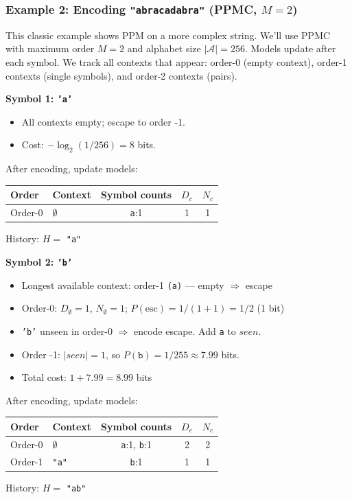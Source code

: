 \subsubsection{Example 2: Encoding \texttt{"abracadabra"} (PPMC, $M=2$)}

This classic example shows PPM on a more complex string. We'll use PPMC with
maximum order $M=2$ and alphabet size $|\mathcal{A}| = 256$. Models update after
each symbol. We track all contexts that appear: order-0 (empty context), 
order-1 contexts (single symbols), and order-2 contexts (pairs).

\begin{examplebox}

\textbf{Symbol 1: \texttt{'a'}}
\begin{itemize}
    \item All contexts empty; escape to order -1.
    \item Cost: $-\log_2(1/256) = 8$ bits.
\end{itemize}
After encoding, update models:

\begin{center}
\footnotesize
\begin{tabular}{|l|l|c|c|c|}
\hline
\textbf{Order} & \textbf{Context} & \textbf{Symbol counts} & $D_c$ & $N_c$ \\
\hline
Order-0 & $\emptyset$ & \texttt{a}:1 & 1 & 1 \\
\hline
\end{tabular}
\end{center}
History: $H =$ \texttt{"a"}

\bigskip
\textbf{Symbol 2: \texttt{'b'}}
\begin{itemize}
    \item Longest available context: order-1 \texttt{(a)} — empty $\Rightarrow$ escape
    \item Order-0: $D_{\emptyset}=1$, $N_{\emptyset}=1$; $P(\text{esc}) = 1/(1+1) = 1/2$ (1 bit)
    \item \texttt{'b'} unseen in order-0 $\Rightarrow$ encode escape. Add \texttt{a} to $seen$.
    \item Order -1: $|seen| = 1$, so $P(\texttt{b}) = 1/255 \approx 7.99$ bits.
    \item Total cost: $1 + 7.99 = 8.99$ bits
\end{itemize}
After encoding, update models:

\begin{center}
\footnotesize
\begin{tabular}{|l|l|c|c|c|}
\hline
\textbf{Order} & \textbf{Context} & \textbf{Symbol counts} & $D_c$ & $N_c$ \\
\hline
Order-0 & $\emptyset$ & \texttt{a}:1, \texttt{b}:1 & 2 & 2 \\
Order-1 & \texttt{"a"} & \texttt{b}:1 & 1 & 1 \\
\hline
\end{tabular}
\end{center}
History: $H =$ \texttt{"ab"}


\end{examplebox}
